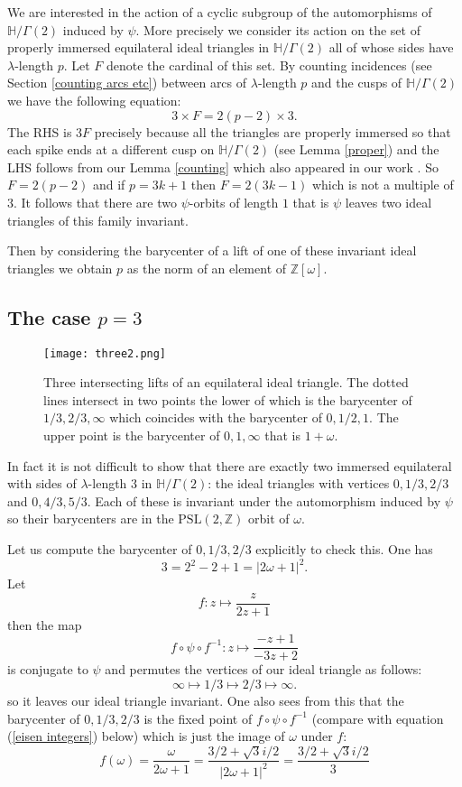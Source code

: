 \documentclass[12pt]{amsart}
\theoremstyle{plain}
\theoremstyle{definition}
\def\HH{\mathbb{H}}
\def\xx{\HH/g2}
\def\ZZ{\mathbb{Z}}
\def\sl2{\mathrm{PSL}(2, \ZZ)}
\def\g2{\Gamma(2)}
\def\xx{\HH/\g2}
\begin{document}
We are interested in the action of a cyclic subgroup of the 
automorphisms of $\xx$ induced by $\psi$.
More precisely we consider its action on the
set of properly immersed equilateral ideal triangles in $\xx$
all of whose sides have $\lambda$-length $p$.
Let $F$ denote the cardinal of this set.
By counting incidences  (see Section \ref{counting arcs etc}) between  
arcs of $\lambda$-length $p$
and the cusps of $\xx$
we  have the following equation:
\begin{equation} \label{incidence}
3 \times F = 2 (p-2) \times 3.
\end{equation}
The RHS is $3F$ precisely because all the  triangles
are properly immersed so that each spike ends at a
different cusp on $\xx$ (see Lemma \ref{proper})
and the LHS follows from our Lemma \ref{counting}
which also  appeared in our work \cite{vlad}.
So $F = 2(p-2)$ and  if $p= 3k + 1$ then $F = 2(3k -1)$
which is not a multiple of $3$.
It follows that there are two $\psi$-orbits of length $1$
that is $\psi$ leaves two ideal triangles of this family invariant.


Then  by considering the barycenter
of a lift of one of these invariant ideal triangles
we obtain $p$ as the norm of an element of $\ZZ[\omega]$.

\subsection{The case $p=3$}


\begin{figure}[ht]
\begin{center}
\texttt{[image: three2.png]} 
\end{center}
\caption{Three intersecting  lifts  of an equilateral ideal triangle.
The dotted lines intersect in two points the lower of which 
is the barycenter of $1/3, 2/3,\infty$
which coincides with the barycenter of $0, 1/2,1$.
The upper point is the barycenter of $0,1,\infty$
that is $1+\omega$.}
\end{figure}

In fact it is not difficult to show that there
are exactly two immersed equilateral 
with sides of  $\lambda$-length $3$ in $\xx$:
the  ideal triangles with vertices $0,1/3,2/3$ 
and   $0,4/3,5/3$.
Each of these is invariant under the 
automorphism induced by $\psi$
so their barycenters are in the $\sl2$ orbit 
of $\omega$.


Let us compute the barycenter of $0,1/3,2/3$ explicitly to check this. 
One has
$$3 = 2^2 - 2 + 1 = | 2\omega + 1 |^2.$$
Let
$$f :  z \mapsto \frac{z}{2z+1}$$
then the map
$$ f \circ \psi \circ f^{-1} :  z \mapsto \frac{-z+ 1}{-3z+2}$$
is conjugate to $\psi$ and permutes the vertices of our ideal
triangle as follows:
$$ \infty \mapsto 1/3 \mapsto 2/3 \mapsto \infty.$$
so it leaves our ideal triangle invariant.
One also sees from this that the barycenter of $0,1/3,2/3$
is the fixed point of $f \circ \psi \circ f^{-1}$ 
(compare with equation (\ref{eisen integers}) below)
which is just the image of $\omega$ under $f$:
$$ f(\omega) = \frac{\omega}{2\omega+1} 
= \frac{3/ 2+ \sqrt{3}i/2 }{|2 \omega + 1 |^2}
= \frac{3/ 2+ \sqrt{3}i/2 }{3}
$$
\end{document}
